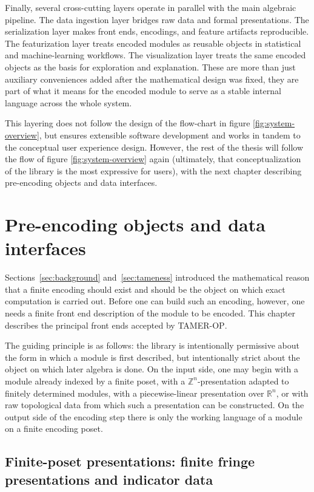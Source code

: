 \documentclass[11pt]{article}
\newcommand{\R}{\mathbb{R}}
\newcommand{\TAMER}{\textsc{TAMER-OP}}
\theoremstyle{definition}
\theoremstyle{remark}
\begin{document}
Finally, several cross-cutting layers operate in parallel with the main algebraic pipeline.  The data ingestion layer bridges raw data and formal presentations.  The serialization layer makes front ends, encodings, and feature artifacts reproducible.  The featurization layer treats encoded modules as reusable objects in statistical and machine-learning workflows.  The visualization layer treats the same encoded objects as the basis for exploration and explanation.  These are more than just auxiliary conveniences added after the mathematical design was fixed, they are part of what it means for the encoded module to serve as a stable internal language across the whole system.

This layering does not follow the design of the flow-chart in figure \ref{fig:system-overview}, but ensures extensible software development and works in tandem to the conceptual user experience design. However, the rest of the thesis will follow the flow of figure \ref{fig:system-overview} again (ultimately, that conceptualization of the library is the most expressive for users), with the next chapter describing pre-encoding objects and data interfaces.


\section{Pre-encoding objects and data interfaces}\label{sec:pre-encoding}

Sections~\ref{sec:background} and~\ref{sec:tameness} introduced the mathematical reason that a finite encoding should exist and should be the object on which exact computation is carried out.  Before one can build such an encoding, however, one needs a finite front end description of the module to be encoded.  This chapter describes the principal front ends accepted by \TAMER{}.

The guiding principle is as follows: the library is intentionally permissive about the form in which a module is first described, but intentionally strict about the object on which later algebra is done.  On the input side, one may begin with a module already indexed by a finite poset, with a \(\mathbb{Z}^n\)-presentation adapted to finitely determined modules, with a piecewise-linear presentation over \(\R^n\), or with raw topological data from which such a presentation can be constructed.  On the output side of the encoding step there is only the working language of a module on a finite encoding poset.

\subsection{Finite-poset presentations: finite fringe presentations and indicator data}
\end{document}
